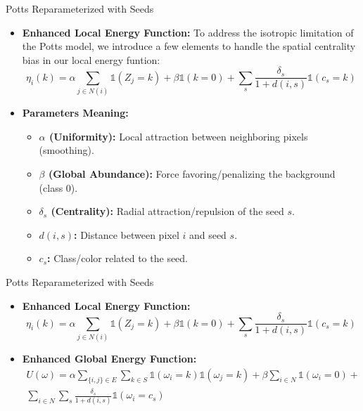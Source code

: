 \documentclass[
  ignorenonframetext,
]{beamer}
\providecommand{\tightlist}{%
  \setlength{\itemsep}{0pt}\setlength{\parskip}{0pt}}\usepackage{longtable,booktabs,array}
\begin{document}
\begin{frame}{Potts Reparameterized with Seeds}
\label{potts-reparameterized-with-seeds}
\begin{itemize}
\tightlist
\item
  \textbf{Enhanced Local Energy Function:} To address the isotropic
  limitation of the Potts model, we introduce a few elements to handle
  the spatial centrality bias in our local energy funtion:
  \[\eta_i(k) = \alpha \sum_{j \in N(i)} \mathds{1}(Z_j = k) + \beta \mathds{1}(k = 0) + \sum_s \frac{\delta_s}{1 + d(i, s)} \mathds{1}(c_s = k)\]
\item
  \textbf{Parameters Meaning:}

  \begin{itemize}
  \tightlist
  \item
    \textbf{\(\alpha\) (Uniformity):} Local attraction between
    neighboring pixels (smoothing).
  \item
    \textbf{\(\beta\) (Global Abundance):} Force favoring/penalizing the
    background (class \(0\)).
  \item
    \textbf{\(\delta_s\) (Centrality):} Radial attraction/repulsion of
    the seed \(s\).
  \item
    \textbf{\(d(i, s)\):} Distance between pixel \(i\) and seed \(s\).
  \item
    \textbf{\(c_s\):} Class/color related to the seed.
  \end{itemize}
\end{itemize}
\end{frame}

\begin{frame}{Potts Reparameterized with Seeds}
\label{potts-reparameterized-with-seeds-1}
\begin{itemize}
\item
  \textbf{Enhanced Local Energy Function:}
  \[\eta_i(k) = \alpha \sum_{j \in N(i)} \mathds{1}(Z_j = k) + \beta \mathds{1}(k = 0) + \sum_s \frac{\delta_s}{1 + d(i, s)} \mathds{1}(c_s = k)\]
\item
  \textbf{Enhanced Global Energy Function:} \[
  \begin{aligned}
  U(\omega) = \alpha \sum_{\{i,j\} \in E} \sum_{k \in S} \mathds{1}(\omega_i = k)\mathds{1}(\omega_j = k) + \beta \sum_{i \in N}\mathds{1}(\omega_i = 0) +  \\
  \sum_{i \in N}  \sum_s \frac{\delta_s}{1 + d(i, s)} \mathds{1}(\omega_i = c_s)
  \end{aligned}
  \]
\end{itemize}
\end{frame}
\end{document}

